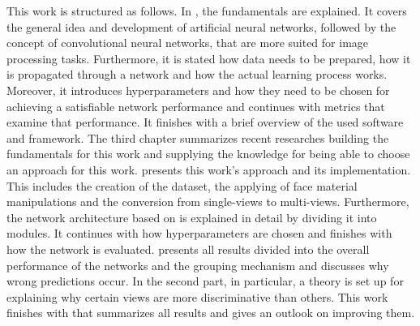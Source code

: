 This work is structured as follows.
In , the fundamentals are explained.
It covers the general idea and development of artificial neural networks, followed by the concept of convolutional neural networks, that are more suited for image processing tasks.
Furthermore, it is stated how data needs to be prepared, how it is propagated through a network and how the actual learning process works.
Moreover, it introduces hyperparameters and how they need to be chosen for achieving a satisfiable network performance and continues with metrics that examine that performance.
It finishes with a brief overview of the used software and framework.
The third chapter  summarizes recent researches building the fundamentals for this work and supplying the knowledge for being able to choose an approach for this work.
 presents this work's approach and its implementation.
This includes the creation of the dataset, the applying of face material manipulations and the conversion from single-views to multi-views.
Furthermore, the network architecture based on \cite{Feng2018} is explained in detail by dividing it into modules.
It continues with how hyperparameters are chosen and finishes with how the network is evaluated.
 presents all results divided into the overall performance of the networks and the grouping mechanism and discusses why wrong predictions occur.
In the second part, in particular, a theory is set up for explaining why certain views are more discriminative than others.
This work finishes with  that summarizes all results and gives an outlook on improving them.